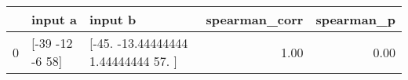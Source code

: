 \begin{tabular}{lllrr}
\toprule
 & input a & input b & spearman\_corr & spearman\_p \\
\midrule
0 & [-39 -12  -6  58] & [-45.         -13.44444444   1.44444444  57.        ] & 1.00 & 0.00 \\
\bottomrule
\end{tabular}
